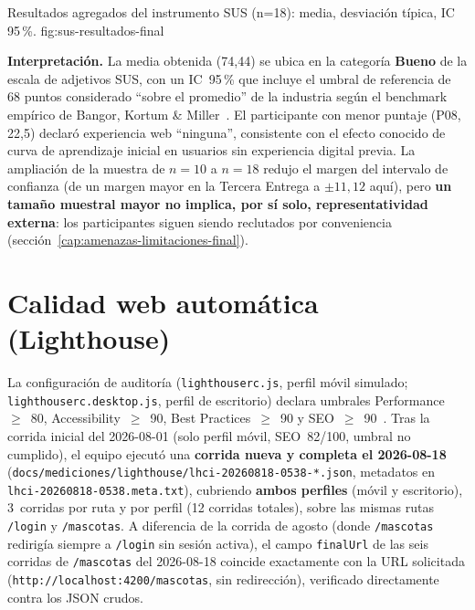 %
{Resultados agregados del instrumento SUS (n=18): media, desviaci\'on t\'ipica, IC 95\,\%.}%
{fig:sus-resultados-final}

\textbf{Interpretaci\'on.} La media obtenida (74{,}44) se ubica en la
categor\'ia \textbf{Bueno} de la escala de adjetivos SUS, con un IC~95\,\%
que incluye el umbral de referencia de 68 puntos considerado ``sobre el
promedio'' de la industria seg\'un el benchmark emp\'irico de Bangor,
Kortum \& Miller~\cite{bangor2008sus}. El participante con menor puntaje
(P08, 22{,}5) declar\'o experiencia web ``ninguna'', consistente con el
efecto conocido de curva de aprendizaje inicial en usuarios sin experiencia
digital previa. La ampliaci\'on de la muestra de $n=10$ a $n=18$ redujo el
margen del intervalo de confianza (de un margen mayor en la Tercera
Entrega a $\pm 11{,}12$ aqu\'i), pero \textbf{un tama\~no muestral mayor no
implica, por s\'i solo, representatividad externa}: los participantes
siguen siendo reclutados por conveniencia (secci\'on~\ref{cap:amenazas-limitaciones-final}).

\section{Calidad web autom\'atica (Lighthouse)}
\label{sec:lighthouse-final}

La configuraci\'on de auditor\'ia (\texttt{lighthouserc.js}, perfil m\'ovil
simulado; \texttt{lighthouserc.desktop.js}, perfil de escritorio) declara
umbrales Performance~$\geq$~80, Accessibility~$\geq$~90, Best
Practices~$\geq$~90 y SEO~$\geq$~90~\cite{lighthouse-docs}. Tras la corrida
inicial del 2026-08-01 (solo perfil m\'ovil, SEO~82/100, umbral no
cumplido), el equipo ejecut\'o una \textbf{corrida nueva y completa el
2026-08-18} (\texttt{docs/mediciones/lighthouse/lhci-20260818-0538-*.json},
metadatos en \texttt{lhci-20260818-0538.meta.txt}), cubriendo \textbf{ambos
perfiles} (m\'ovil y escritorio), 3~corridas por ruta y por perfil (12
corridas totales), sobre las mismas rutas \texttt{/login} y
\texttt{/mascotas}. A diferencia de la corrida de agosto (donde
\texttt{/mascotas} redirig\'ia siempre a \texttt{/login} sin sesi\'on
activa), el campo \texttt{finalUrl} de las seis corridas de
\texttt{/mascotas} del 2026-08-18 coincide exactamente con la URL
solicitada (\texttt{http://localhost:4200/mascotas}, sin redirecci\'on),
verificado directamente contra los JSON crudos.

